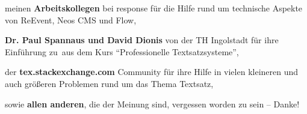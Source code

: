 \noindent
meinen \textbf{Arbeitskollegen} bei response für die Hilfe rund um technische Aspekte von ReEvent, Neos CMS und Flow,
\vspace*{5pt}

\noindent
\textbf{Dr. Paul Spannaus und David Dionis} von der TH Ingolstadt für ihre Einführung zu \ctLaTeX\,aus dem Kurs \enquote{Professionelle Textsatzsysteme},
\vspace*{5pt}

\noindent
der \textbf{tex.stackexchange.com} Community für ihre Hilfe in vielen kleineren und auch größeren Problemen rund um das Thema Textsatz,
\vspace*{5pt}

\noindent
sowie \textbf{allen anderen}, die der Meinung sind, vergessen worden zu sein -- Danke!

